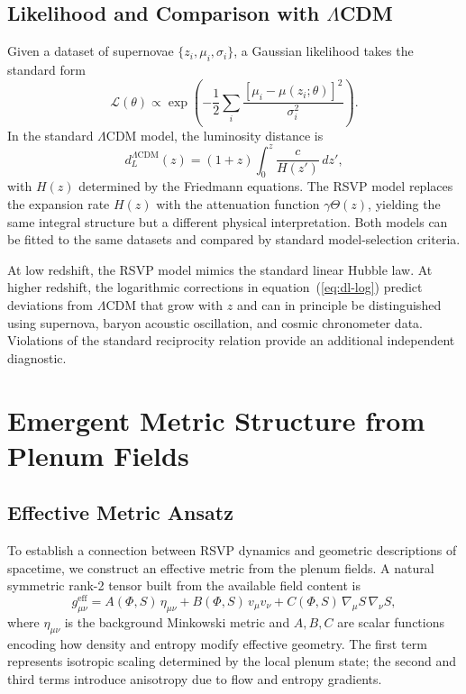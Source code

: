 \documentclass[12pt,a4paper]{article}
\theoremstyle{plain}
\theoremstyle{definition}
\theoremstyle{remark}
\begin{document}
\subsection{Likelihood and Comparison with $\Lambda$CDM}

Given a dataset of supernovae $\{z_i,\mu_i,\sigma_i\}$, a Gaussian
likelihood takes the standard form
\begin{equation}
\mathcal{L}(\theta) \propto \exp\!\left(
-\frac{1}{2}\sum_i\frac{[\mu_i - \mu(z_i;\theta)]^2}{\sigma_i^2}
\right).
\end{equation}
In the standard $\Lambda$CDM model, the luminosity distance is
\begin{equation}
d_L^{\Lambda\mathrm{CDM}}(z) = (1+z)\int_0^z\frac{c}{H(z')}\,dz',
\end{equation}
with $H(z)$ determined by the Friedmann equations. The RSVP model
replaces the expansion rate $H(z)$ with the attenuation function
$\gamma\Theta(z)$, yielding the same integral structure but a
different physical interpretation. Both models can be fitted to the
same datasets and compared by standard model-selection criteria.

At low redshift, the RSVP model mimics the standard linear Hubble law.
At higher redshift, the logarithmic corrections in equation~(\ref{eq:dl-log})
predict deviations from $\Lambda$CDM that grow with $z$ and can in
principle be distinguished using supernova, baryon acoustic oscillation,
and cosmic chronometer data. Violations of the standard reciprocity
relation provide an additional independent diagnostic.

\section{Emergent Metric Structure from Plenum Fields}
\label{sec:emergentmetric}

\subsection{Effective Metric Ansatz}

To establish a connection between RSVP dynamics and geometric
descriptions of spacetime, we construct an effective metric from the
plenum fields. A natural symmetric rank-2 tensor built from the
available field content is
\begin{equation}
g_{\mu\nu}^{\mathrm{eff}} =
A(\Phi,S)\,\eta_{\mu\nu}
+ B(\Phi,S)\,v_\mu v_\nu
+ C(\Phi,S)\,\nabla_\mu S\,\nabla_\nu S,
\end{equation}
where $\eta_{\mu\nu}$ is the background Minkowski metric and
$A,B,C$ are scalar functions encoding how density and entropy modify
effective geometry. The first term represents isotropic scaling
determined by the local plenum state; the second and third terms
introduce anisotropy due to flow and entropy gradients.
\end{document}
